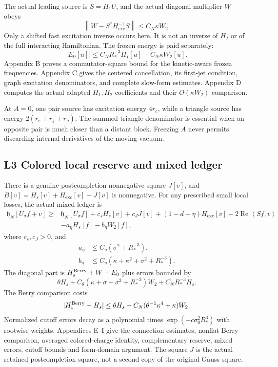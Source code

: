\documentclass[11pt,letterpaper]{article}
\theoremstyle{definition}\newtheorem{hypothesis}[theorem]{Hypothesis}
\newcommand{\Rea}{\operatorname{Re}}
\newcommand{\exc}{\mathrm{exc}}
\newcommand{\hh}{\mathfrak h}
\newcommand{\norm}[1]{\left\lVert #1\right\rVert}
\newcommand{\ip}[2]{\left\langle #1,#2\right\rangle}
\numberwithin{equation}{section}
\begin{document}
The actual leading source is $S=H_1U$, and the actual diagonal multiplier $W$ obeys
\begin{equation}
 \norm{W-S^*H_{\exc}^{-1}S}\le C_N\kappa W_2.\label{eq:source}
\end{equation}
Only a shifted fast excitation inverse occurs here. It is not an inverse of $H_I$ or of the full interacting Hamiltonian. The frozen energy is paid separately:
\begin{equation}
 |E_0[u]|\le C_NR_*^{-3}H_I[u]+C_N\kappa W_2[u].\label{eq:e0}
\end{equation}
Appendix B proves a commutator-square bound for the kinetic-aware frozen frequencies. Appendix C gives the centered cancellation, its first-jet condition, graph excitation denominators, and complete slow-form estimates. Appendix D computes the actual adapted $H_1,H_2$ coefficients and their $O(\kappa W_2)$ comparison.

At $A=0$, one pair source has excitation energy $4r_e$, while a triangle source has energy $2(r_e+r_f+r_g)$. The summed triangle denominator is essential when an opposite pair is much closer than a distant block. Freezing $A$ never permits discarding internal derivatives of the moving vacuum.

\subsection{L3 Colored local reserve and mixed ledger}
There is a genuine postcompletion nonnegative square $J[v]$, and
$B[v]=H_s[v]+H_{\exc}[v]+J[v]$ is nonnegative. For any prescribed small local losses, the actual mixed ledger is
\begin{align}
 \hh_N[U_\sigma f+v]\ge{}&\hh_N[U_\sigma f]
 +c_sH_s[v]+c_JJ[v]+(1-d-\eta)H_{\exc}[v]
 +2\Rea\ip{Sf}{v}\nonumber\\
 &-a_\eta H_s[f]-b_\eta W_2[f],\label{eq:mixed}
\end{align}
where $c_s,c_J>0$, and
\begin{align}
 a_\eta&\le C_\eta(\sigma^2+R_*^{-3}),\\
 b_\eta&\le C_\eta(\kappa+\kappa^2+\sigma^2+R_*^{-3}).
\end{align}
The diagonal part is $H_s^{\rm Berry}+W+E_0$ plus errors bounded by
\begin{equation}
 \theta H_s+C_\theta(\kappa+\sigma+\sigma^2+R_*^{-3})W_2+C_NR_*^{-3}H_s.
\end{equation}
The Berry comparison costs
\begin{equation}
 |H_s^{\rm Berry}-H_s|\le\theta H_s+C_N(\theta^{-1}\kappa^4+\kappa)W_2.
\end{equation}
Normalized cutoff errors decay as a polynomial times $\exp(-c\sigma_0^2R_*^3)$ with rootwise weights. Appendices E--I give the connection estimates, nonflat Berry comparison, averaged colored-charge identity, complementary reserve, mixed errors, cutoff bounds and form-domain argument. The square $J$ is the actual retained postcompletion square, not a second copy of the original Gauss square.
\end{document}
